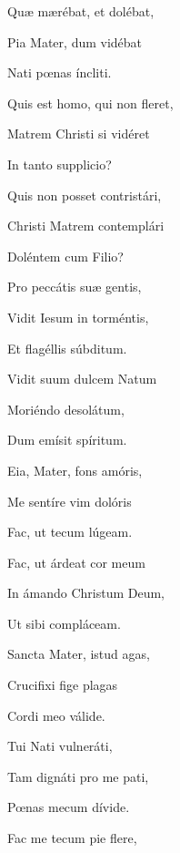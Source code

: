 \documentclass[12pt,a6paper]{book}
\begin{document}
\begin{sloppy}
Quæ mærébat, et dolébat,

Pia Mater, dum vidébat

Nati pœnas íncliti.

\vspace{3mm}

Quis est homo, qui non fleret,

Matrem Christi si vidéret

In tanto supplicio?

\vspace{3mm}

Quis non posset contristári,

Christi Matrem contemplári

Doléntem cum Filio?

\vspace{3mm}

Pro peccátis suæ gentis,

Vidit Iesum in torméntis,

Et flagéllis súbditum.

\vspace{3mm}

Vidit suum dulcem Natum

Moriéndo desolátum,

Dum emísit spíritum.

\vspace{3mm}

Eia, Mater, fons amóris,

Me sentíre vim dolóris

Fac, ut tecum lúgeam.

\vspace{3mm}

Fac, ut árdeat cor meum

In ámando Christum Deum,

Ut sibi compláceam.

\vspace{3mm}

Sancta Mater, istud agas,

Crucifixi fige plagas

Cordi meo válide.

\vspace{3mm}

Tui Nati vulneráti,

Tam dignáti pro me pati,

Pœnas mecum dívide.

\vspace{3mm}

Fac me tecum pie flere,


\end{sloppy}
\end{document}
